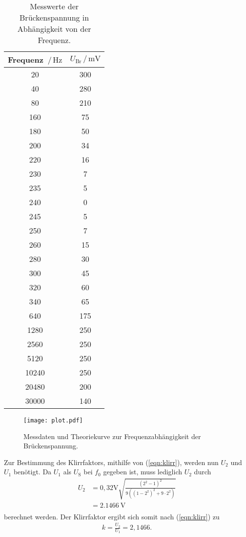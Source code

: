 \begin{table}[H]
  \centering
  \caption{Messwerte der Brückenspannung in Abhängigkeit von der Frequenz.}
  \label{tab:wertee}
  \begin{tabular}{c c}
    \toprule
    Frequenz $\,/\,\si{\hertz}$ &  $U_{\text{Br}}\,/\, \si{\milli\volt}$ \\
    \midrule
    20 & 300 \\
    40 & 280 \\
    80 & 210 \\
    160 & 75 \\
    180 & 50 \\
    200 & 34 \\
    220 & 16 \\
    230 & 7 \\
    235 & 5 \\
    240 & 0 \\
    245 & 5 \\
    250 & 7 \\
    260 & 15 \\
    280 & 30 \\
    300 & 45 \\
    320 & 60 \\
    340 & 65 \\
    640 & 175 \\
    1280 & 250 \\
    2560 & 250 \\
    5120 &  250 \\
    10240 & 250 \\
    20480 & 200 \\
    30000 & 140 \\
    \bottomrule
  \end{tabular}
\end{table}

\begin{figure}[H]
  \centering
  \texttt{[image: plot.pdf]}
  \caption{Messdaten und Theoriekurve zur Frequenzabhängigkeit der Brückenspannung.}
  \label{fig:plot}
\end{figure}

Zur Bestimmung des Klirrfaktors, mithilfe von  (\ref{eqn:klirr}), werden nun $U_2$ und $U_1$ benötigt. Da $U_1$ als $U_{\text{S}}$ bei $f_0$ gegeben ist, muss lediglich $U_2$ durch
\begin{align*}
  U_2 &= 0,32\si{\volt}{\sqrt{\frac{(2^2 - 1)^2}{9((1-2^2)^2 + 9 \cdot 2^2)}}} \\
  &= \SI{2,1466}{\volt} \\
\end{align*}
berechnet werden.
Der Klirrfaktor ergibt sich somit nach (\ref{eqn:klirr}) zu
\begin{align*}
  k = \frac{U_2}{U_1} = 2,1466. \\
\end{align*}